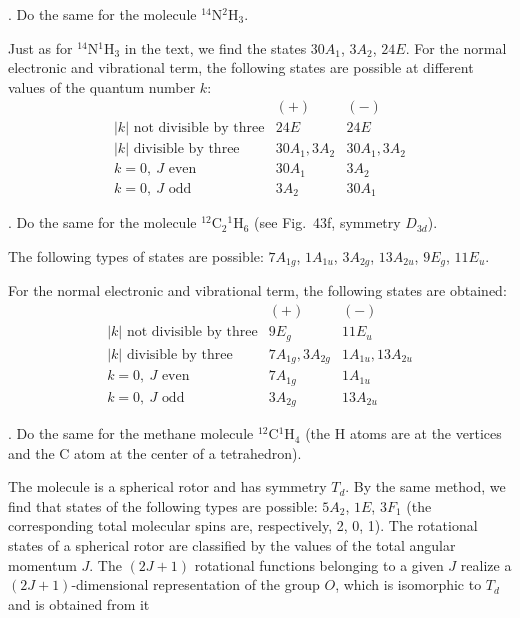 . Do the same for the molecule ${}^{14}\mathrm N{}^2\mathrm H_3$.

\SolutionHeading Just as for ${}^{14}\mathrm N{}^1\mathrm H_3$ in the text, we find the states $30A_1$, $3A_2$, $24E$. For the normal electronic and vibrational term, the following states are possible at different values of the quantum number $k$:
\[
\begin{array}{l|cc}&(+)&(-)\\\hline
|k|\text{ not divisible by three}&24E&24E\\
|k|\text{ divisible by three}&30A_1,3A_2&30A_1,3A_2\\
k=0,\ J\text{ even}&30A_1&3A_2\\
k=0,\ J\text{ odd}&3A_2&30A_1
\end{array}
\]

. Do the same for the molecule ${}^{12}\mathrm C_2{}^1\mathrm H_6$ (see Fig.~43f, symmetry $D_{3d}$).

\SolutionHeading The following types of states are possible: $7A_{1g}$, $1A_{1u}$, $3A_{2g}$, $13A_{2u}$, $9E_g$, $11E_u$.

For the normal electronic and vibrational term, the following states are obtained:
\[
\begin{array}{l|cc}&(+)&(-)\\\hline
|k|\text{ not divisible by three}&9E_g&11E_u\\
|k|\text{ divisible by three}&7A_{1g},3A_{2g}&1A_{1u},13A_{2u}\\
k=0,\ J\text{ even}&7A_{1g}&1A_{1u}\\
k=0,\ J\text{ odd}&3A_{2g}&13A_{2u}
\end{array}
\]

. Do the same for the methane molecule ${}^{12}\mathrm C{}^1\mathrm H_4$ (the H atoms are at the vertices and the C atom at the center of a tetrahedron).

\SolutionHeading The molecule is a spherical rotor and has symmetry $T_d$. By the same method, we find that states of the following types are possible: $5A_2$, $1E$, $3F_1$ (the corresponding total molecular spins are, respectively, 2, 0, 1). The rotational states of a spherical rotor are classified by the values of the total angular momentum $J$. The $(2J+1)$ rotational functions belonging to a given $J$ realize a $(2J+1)$-dimensional representation of the group $O$, which is isomorphic to $T_d$ and is obtained from it

